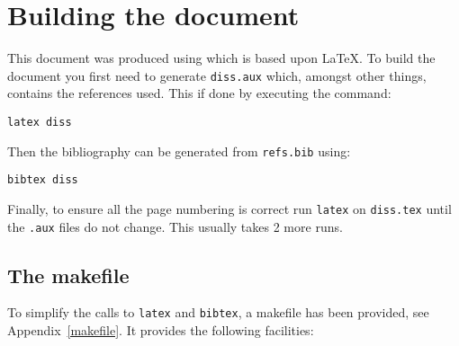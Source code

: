 \documentclass[12pt,twoside,notitlepage]{report}
\begin{document}
\section{Building the document}

This document was produced using \LaTeXe which is based upon
\LaTeX\cite{Lamport86}.  To build the document you first need to
generate {\tt diss.aux} which, amongst other things, contains the
references used.  This if done by executing the command:

{\tt latex diss}

\noindent
Then the bibliography can be generated from {\tt refs.bib} using:

{\tt bibtex diss}

\noindent
Finally, to ensure all the page numbering is correct run {\tt latex}
on {\tt diss.tex} until the {\tt .aux} files do not change.  This
usually takes 2 more runs.

\subsection{The makefile}

To simplify the calls to {\tt latex} and {\tt bibtex},
a makefile has been provided, see Appendix~\ref{makefile}.
It provides the following facilities:
\end{document}
